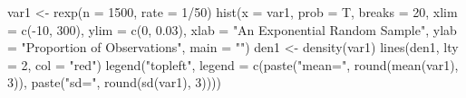 \begin{Schunk}
\begin{Sinput}
 var1 <- rexp(n = 1500, rate = 1/50)
 hist(x = var1, prob = T, breaks = 20, xlim = c(-10, 
     300), ylim = c(0, 0.03), xlab = "An Exponential Random Sample", 
     ylab = "Proportion of Observations", main = "")
 den1 <- density(var1)
 lines(den1, lty = 2, col = "red")
 legend("topleft", legend = c(paste("mean=", 
     round(mean(var1), 3)), paste("sd=", round(sd(var1), 
     3))))
\end{Sinput}
\end{Schunk}
